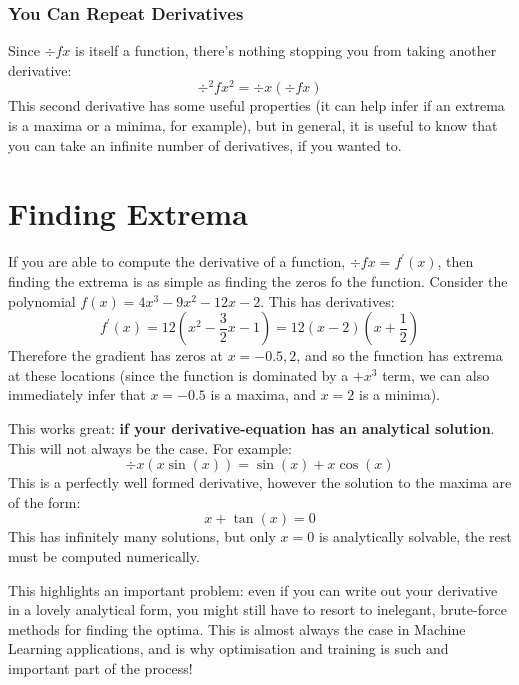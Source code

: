 \documentclass[a4paper,openany,11pt]{book}
\begin{document}
					\subsubsection{You Can Repeat Derivatives}

						Since $\div{f}{x}$ is itself a function, there's nothing stopping you from taking another derivative:
						\begin{equation}
							\div{^2f}{x^2} = \div{}{x} \left( \div{f}{x} \right)
						\end{equation}
						This second derivative has some useful properties (it can help infer if an extrema is a maxima or a minima, for example), but in general, it is useful to know that you can take an infinite number of derivatives, if you wanted to.

				\section{Finding Extrema}

						If you are able to compute the derivative of a function, $\div{f}{x} = f^\prime(x)$, then finding the extrema is as simple as finding the zeros fo the function. Consider the polynomial $f(x) = 4 x^3 - 9 x^2 - 12x - 2$. This has derivatives:
						\begin{equation}
							f^\prime(x) = 12\left(x^2 - \frac{3}{2} x - 1 \right) = 12(x-2)\left(x + \frac{1}{2}\right)
						\end{equation}
						Therefore the gradient has zeros at $x = -0.5, 2$, and so the function has extrema at these locations (since the function is dominated by a $+x^3$ term, we can also immediately infer that $x=-0.5$ is a maxima, and $x = 2$ is a minima).
		
						This works great: \textbf{if your derivative-equation has an analytical solution}. This will not always be the case. For example:
						\begin{equation}
							\div{}{x} \left( x \sin(x) \right) = \sin(x) + x \cos(x)
						\end{equation}
						This is a perfectly well formed derivative, however the solution to the maxima are of the form:
						\begin{equation}
							x + \tan(x) = 0
						\end{equation}
						This has infinitely many solutions, but only $x = 0$ is analytically solvable, the rest must be computed numerically.

						This highlights an important problem: even if you can write out your derivative in a lovely analytical form, you might still have to resort to inelegant, brute-force methods for finding the optima. This is almost always the case in Machine Learning applications, and is why optimisation and training is such and important part of the process!
\end{document}
